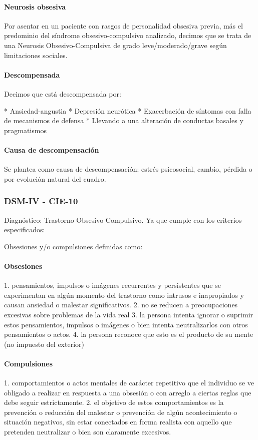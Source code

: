 \paragraph{Neurosis obsesiva}
Por asentar en un paciente con rasgos de personalidad obsesiva previa, más el predominio del síndrome obsesivo-compulsivo analizado, decimos que se trata de una Neurosis Obsesivo-Compulsiva de grado leve/moderado/grave según limitaciones sociales.
\paragraph{Descompensada}
Decimos que está descompensada por:

* Ansiedad-angustia
* Depresión neurótica
* Exacerbación de síntomas con falla de mecanismos de defensa
* Llevando a una alteración de conductas basales y pragmatismos

\paragraph{Causa de descompensación}
Se plantea como causa de descompensación: estrés psicosocial, cambio, pérdida o por evolución natural del cuadro.
\subsubsection{DSM-IV - CIE-10}

Diagnóstico: Trastorno Obsesivo-Compulsivo. Ya que cumple con los criterios especificados:

Obsesiones y/o compulsiones definidas como:

\paragraph{Obsesiones}
1. pensamientos, impulsos o imágenes recurrentes y persistentes que se experimentan en algún momento del trastorno como intrusos e inapropiados y causan ansiedad o malestar significativos.
2. no se reducen a preocupaciones excesivas sobre problemas de la vida real
3. la persona intenta ignorar o suprimir estos pensamientos, impulsos o imágenes o bien intenta neutralizarlos con otros pensamientos o actos.
4. la persona reconoce que esto es el producto de su mente (no impuesto del exterior)

\paragraph{Compulsiones}
1. comportamientos o actos mentales de carácter repetitivo que el individuo se ve obligado a realizar en respuesta a una obsesión o con arreglo a ciertas reglas que debe seguir estrictamente.
2. el objetivo de estos comportamientos es la prevención o reducción del malestar o prevención de algún acontecimiento o situación negativos, sin estar conectados en forma realista con aquello que pretenden neutralizar o bien son claramente excesivos.

